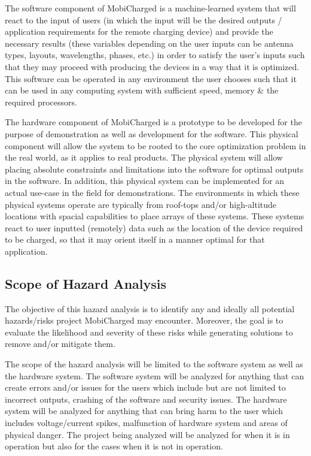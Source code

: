 \documentclass[12pt, titlepage]{article}
\begin{document}
The software component of MobiCharged is a machine-learned system that will react to the input of users (in which the input will be the desired outputs / application requirements for the remote charging device) and provide the necessary results (these variables depending on the user inputs can be antenna types, layouts, wavelengths, phases, etc.)  in order to satisfy the user’s inputs such that they may proceed with producing the devices in a way that it is optimized. This software can be operated in any environment the user chooses such that it can be used in any computing system with sufficient speed, memory \& the required processors. 
\par
The hardware component of MobiCharged is a prototype to be developed for the purpose of demonstration as well as development for the software. This physical component will allow the system to be rooted to the core optimization problem in the real world, as it applies to real products. The physical system will allow placing absolute constraints and limitations into the software for optimal outputs in the software. In addition, this physical system can be implemented for an actual use-case in the field for demonstrations. The environments in which these physical systems operate are typically from roof-tops and/or high-altitude locations with spacial capabilities to place arrays of these systems. These systems react to user inputted (remotely) data such as the location of the device required to be charged, so that it may orient itself in a manner optimal for that application. 

\subsection{Scope of Hazard Analysis}
The objective of this hazard analysis is to identify any and ideally all potential hazards/risks project MobiCharged may encounter. Moreover, the goal is to evaluate the likelihood and severity of these risks while generating solutions to remove and/or mitigate them.
\par
The scope of the hazard analysis will be limited to the software system as well as the hardware system. The software system will be analyzed for anything that can create errors and/or issues for the users which include but are not limited to incorrect outputs, crashing of the software and security issues. The hardware system will be analyzed for anything that can bring harm to the user which includes voltage/current spikes, malfunction of hardware system and areas of physical danger. The project being analyzed will be analyzed for when it is in operation but also for the cases when it is not in operation. 
\end{document}
